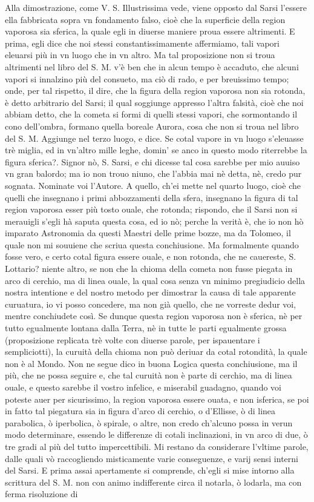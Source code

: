 \documentclass[11pt,twoside,openany]{book}
\begin{document}
Alla dimostrazione, come V. S. Illustrissima vede, viene opposto dal Sarsi l'essere ella fabbricata sopra vn fondamento falso, cioè che la superficie della region vaporosa sia sferica, la quale egli in diuerse maniere proua essere altrimenti. E prima, egli dice che noi stessi constantissimamente affermiamo, tali vapori eleuarsi più in vn luogo che in vn altro. Ma tal proposizione non si troua altrimenti nel libro del S. M. v'è ben che in alcun tempo è accaduto, che alcuni vapori si innalzino più del consueto, ma ciò di rado, e per breuissimo tempo; onde, per tal rispetto, il dire, che la figura della region vaporosa non sia rotonda, è detto arbitrario del Sarsi; il qual soggiunge appresso l'altra falsità, cioè che noi abbiam detto, che la cometa si formi di quelli stessi vapori, che sormontando il cono dell'ombra, formano quella boreale Aurora, cosa che non si troua nel libro del S. M. Aggiunge nel terzo luogo, e dice. Se cotal vapore in vn luogo s'eleuasse trè miglia, ed in vn'altro mille leghe, domin' se anco in questo modo riterrebbe la figura sferica?. Signor nò, S. Sarsi, e chi dicesse tal cosa sarebbe per mio auuiso vn gran balordo; ma io non trouo niuno, che l'abbia mai nè detta, nè, credo pur sognata. Nominate voi l'Autore. A quello, ch'ei mette nel quarto luogo, cioè che quelli che insegnano i primi abbozzamenti della sfera, insegnano la figura di tal region vaporosa esser più tosto ouale, che rotonda; rispondo, che il Sarsi non si merauigli s'egli hà saputa questa cosa, ed io nò; perche la verità è, che io non hò imparato Astronomia da questi Maestri delle prime bozze, ma da Tolomeo, il quale non mi souuiene che scriua questa conchiusione. Ma formalmente quando fosse vero, e certo cotal figura essere ouale, e non rotonda, che ne cauereste, S. Lottario? niente altro, se non che la chioma della cometa non fusse piegata in arco di cerchio, ma di linea ouale, la qual cosa senza vn minimo pregiudicio della nostra intentione e del nostro metodo per dimostrar la causa di tale apparente curuatura, io vi posso concedere, ma non già quello, che ne vorreste dedur voi, mentre conchiudete così. Se dunque questa region vaporosa non è sferica, nè per tutto egualmente lontana dalla Terra, nè in tutte le parti egualmente grossa (proposizione replicata trè volte con diuerse parole, per ispauentare i sempliciotti), la curuità della chioma non può deriuar da cotal rotondità, la quale non è al Mondo. Non ne segue dico in buona Logica questa conchiusione, ma il più, che ne possa seguire e, che tal curuità non è parte di cerchio, ma di linea ouale, e questo sarebbe il vostro infelice, e miserabil guadagno, quando voi poteste auer per sicurissimo, la region vaporosa essere ouata, e non isferica, se poi in fatto tal piegatura sia in figura d'arco di cerchio, o d'Ellisse, ò di linea parabolica, ò iperbolica, ò spirale, o altre, non credo ch'alcuno possa in verun modo determinare, essendo le differenze di cotali inclinazioni, in vn arco di due, ò tre gradi al più del tutto impercettibili. Mi restano da considerare l'vltime parole, dalle quali vò raccogliendo misticamente varie conseguenze, e varij sensi interni del Sarsi. E prima assai apertamente si comprende, ch'egli si mise intorno alla scrittura del S. M. non con animo indifferente circa il notarla, ò lodarla, ma con ferma risoluzione di 
\end{document}
